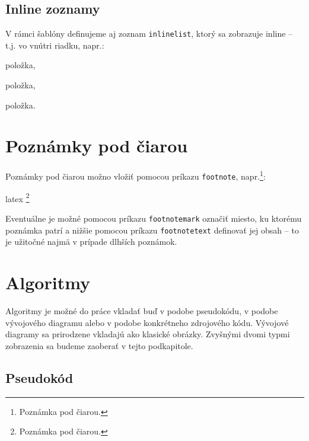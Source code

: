 \subsection{Inline zoznamy}

V rámci šablóny definujeme aj zoznam \texttt{inlinelist}, ktorý sa zobrazuje inline -- t.j. vo vnútri riadku, napr.:
\begin{inlinelist}
\item položka,
\item položka,
\item položka.
\end{inlinelist}

\section{Poznámky pod čiarou}

Poznámky pod čiarou možno vložiť pomocou príkazu \texttt{footnote}, napr.\footnote{Poznámka pod čiarou.}:
\begin{inlinecode}{latex}
\footnote{Poznámka pod čiarou.}
\end{inlinecode}

Eventuálne je možné pomocou príkazu \texttt{footnotemark} označiť miesto, ku ktorému poznámka patrí a nižšie pomocou príkazu \texttt{footnotetext} definovať jej obsah -- to je užitočné najmä v prípade dlhších poznámok.

\section{Algoritmy}

Algoritmy je možné do práce vkladať buď v podobe pseudokódu, v podobe vývojového diagramu alebo v podobe konkrétneho zdrojového kódu. Vývojové diagramy sa prirodzene vkladajú ako klasické obrázky. Zvyšnými dvomi typmi zobrazenia sa budeme zaoberať v tejto podkapitole.

\subsection{Pseudokód}

